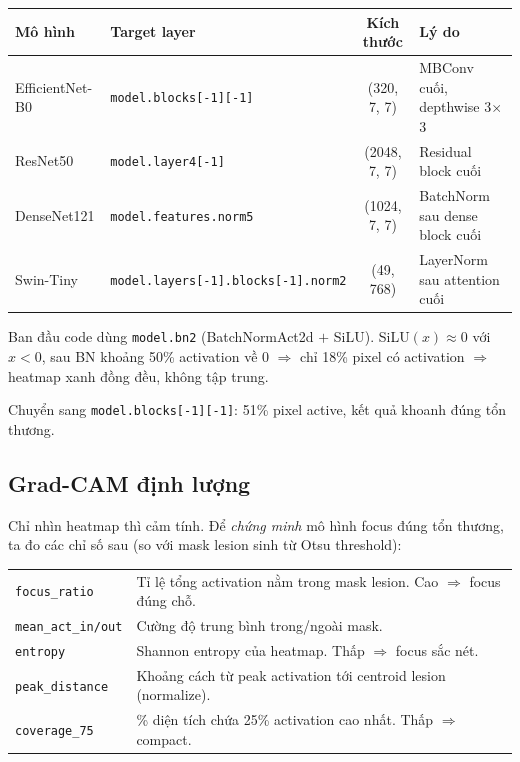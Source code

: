 \documentclass[11pt,a4paper]{article}
\begin{document}
\begin{table}[h]
\centering\small
\begin{tabular}{llcl}
\toprule
\textbf{Mô hình} & \textbf{Target layer} & \textbf{Kích thước} & \textbf{Lý do} \\
\midrule
EfficientNet-B0 & \texttt{model.blocks[-1][-1]}    & (320, 7, 7) & MBConv cuối, depthwise 3$\times$3 \\
ResNet50        & \texttt{model.layer4[-1]}        & (2048, 7, 7) & Residual block cuối \\
DenseNet121     & \texttt{model.features.norm5}    & (1024, 7, 7) & BatchNorm sau dense block cuối \\
Swin-Tiny       & \texttt{model.layers[-1].blocks[-1].norm2} & (49, 768) & LayerNorm sau attention cuối \\
\bottomrule
\end{tabular}
\end{table}

\begin{idea}
Ban đầu code dùng \texttt{model.bn2} (BatchNormAct2d $+$ SiLU). SiLU$(x) \approx 0$ với $x < 0$, sau BN khoảng 50\% activation về 0 $\Rightarrow$ chỉ 18\% pixel có activation $\Rightarrow$ heatmap xanh đồng đều, không tập trung.

Chuyển sang \texttt{model.blocks[-1][-1]}: 51\% pixel active, kết quả khoanh đúng tổn thương.
\end{idea}

\subsection{Grad-CAM định lượng}

Chỉ nhìn heatmap thì cảm tính. Để \textit{chứng minh} mô hình focus đúng tổn thương, ta đo các chỉ số sau (so với mask lesion sinh từ Otsu threshold):

\begin{table}[h]
\centering\small
\begin{tabular}{lp{9cm}}
\toprule
\texttt{focus\_ratio}       & Tỉ lệ tổng activation nằm trong mask lesion. Cao $\Rightarrow$ focus đúng chỗ. \\
\texttt{mean\_act\_in/out}  & Cường độ trung bình trong/ngoài mask. \\
\texttt{entropy}            & Shannon entropy của heatmap. Thấp $\Rightarrow$ focus sắc nét. \\
\texttt{peak\_distance}     & Khoảng cách từ peak activation tới centroid lesion (normalize). \\
\texttt{coverage\_75}       & \% diện tích chứa 25\% activation cao nhất. Thấp $\Rightarrow$ compact. \\
\bottomrule
\end{tabular}
\end{table}
\end{document}

